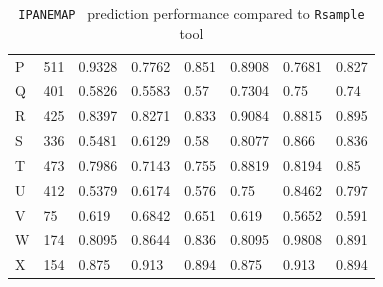\documentclass[11pt]{article} %
\newcommand{\Software}[1]{\texttt{#1}}
\newcommand{\OurTool}{\Software{IPANEMAP}}
\begin{document}
\begin{table}
\begin{adjustbox}{max width=\textwidth,max totalheight=\textheight,keepaspectratio}
\begin{tabular}{llllHllH}
P	&	511	&	0.9328	&	0.7762	&	0.851	&	0.8908	&	0.7681	&	0.827	\\
Q	&	401	&	0.5826	&	0.5583	&	0.57	&	0.7304	&	0.75	&	0.74	\\
R	&	425	&	0.8397	&	0.8271	&	0.833	&	0.9084	&	0.8815	&	0.895	\\
S	&	336	&	0.5481	&	0.6129	&	0.58	&	0.8077	&	0.866	&	0.836	\\
T	&	473	&	0.7986	&	0.7143	&	0.755	&	0.8819	&	0.8194	&	0.85	\\
U	&	412	&	0.5379	&	0.6174	&	0.576	&	0.75	&	0.8462	&	0.797	\\
V	&	75	&	0.619	&	0.6842	&	0.651	&	0.619	&	0.5652	&	0.591	\\
W	&	174	&	0.8095	&	0.8644	&	0.836	&	0.8095	&	0.9808	&	0.891	\\
X	&	154	&	0.875	&	0.913	&	0.894	&	0.875	&	0.913	&	0.894	\\

\bottomrule
\end{tabular}
\end{adjustbox}
\caption{\OurTool~ prediction performance compared to \Software{Rsample} tool}
\end{table}
\end{document}
